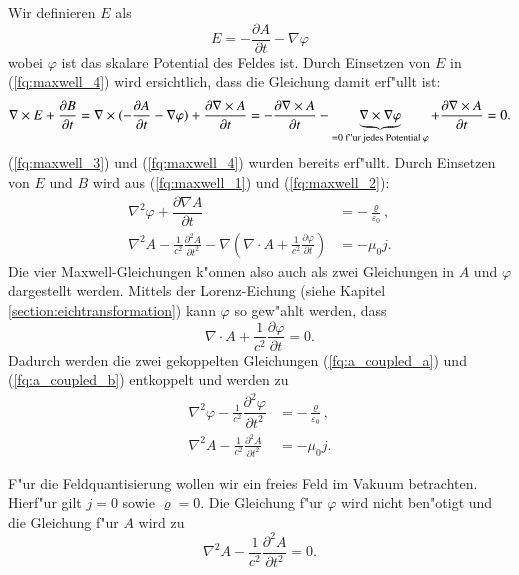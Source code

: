 \begin{refsection}
Wir definieren $E$ als
\begin{equation}
E = -\dfrac{\partial A}{\partial t} - \nabla \varphi
\end{equation}
wobei $\varphi$ ist das skalare Potential des Feldes ist. Durch Einsetzen von $E$ in (\ref{fq:maxwell_4}) wird ersichtlich, dass die Gleichung damit erf"ullt ist:
\begin{equation*}
\nabla\times E + \frac{\partial B }{\partial t} = \nabla\times (-\dfrac{\partial A}{\partial t} - \nabla \varphi) + \frac{\partial \nabla\times A }{\partial t} = 
- \frac{\partial \nabla\times A }{\partial t} - \underbrace{\nabla\times \nabla \varphi}_{=0\text{ f"ur jedes Potential } \varphi} + \frac{\partial \nabla\times A }{\partial t} = 0.\\
\end{equation*}
(\ref{fq:maxwell_3}) und (\ref{fq:maxwell_4}) wurden bereits erf"ullt. Durch Einsetzen von $E$ und $B$ wird aus (\ref{fq:maxwell_1}) und (\ref{fq:maxwell_2}):
\begin{align} 
 \label{fq:a_coupled_a}
 \nabla^2 \varphi + \dfrac{\partial \nabla A}{\partial t} &= -\frac{\varrho}{\varepsilon_0}, \\
 \label{fq:a_coupled_b}
 \nabla^2 A - \frac{1}{c^2} \frac{\partial^2 A }{\partial t^2} - \nabla \left( \nabla \cdot A + \frac{1}{c^2} \frac{\partial \varphi }{\partial t} \right) &= - \mu_0 j.
\end{align}
Die vier Maxwell-Gleichungen k"onnen also auch als zwei Gleichungen in $A$ und $\varphi$ dargestellt werden.
Mittels der Lorenz-Eichung (siehe Kapitel \ref{section:eichtransformation}) kann $\varphi$ so gew"ahlt werden, dass
\begin{equation} \label{fq:lorenz_eq}
\nabla \cdot A + \frac{1}{c^2} \frac{\partial \varphi }{\partial t} = 0.
\end{equation}
Dadurch werden die zwei gekoppelten Gleichungen (\ref{fq:a_coupled_a}) und (\ref{fq:a_coupled_b}) entkoppelt und werden zu
\begin{align*}
\nabla^2 \varphi - \frac{1}{c^2} \dfrac{\partial^2 \varphi}{\partial t^2} &= -\frac{\varrho}{\varepsilon_0}, \\
\nabla^2 A - \frac{1}{c^2} \frac{\partial^2 A }{\partial t^2} &= - \mu_0 j.
\end{align*}

F"ur die Feldquantisierung wollen wir ein freies Feld im Vakuum betrachten. Hierf"ur gilt $j = 0$ sowie $\varrho = 0$.
Die Gleichung f"ur $\varphi$ wird nicht ben"otigt und die Gleichung f"ur $A$ wird zu
\begin{equation} \label{fq:wave_dgl}
\nabla^2 A - \frac{1}{c^2} \frac{\partial^2 A }{\partial t^2} = 0.
\end{equation}


\end{refsection}
